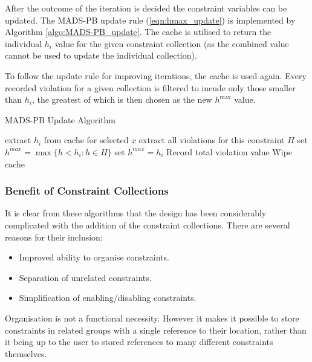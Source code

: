 After the outcome of the iteration is decided the constraint variables can be updated. The MADS-PB update rule (\ref{eqn:hmax_update}) is implemented by Algorithm \ref{algo:MADS-PB_update}. The cache is utilised to return the individual $h_i$ value for the given constraint collection (as the combined value cannot be used to update the individual collection). 

To follow the update rule for improving iterations, the cache is used again. Every recorded violation for a given collection is filtered to incude only those smaller than $h_i$, the greatest of which is then chosen as the new $h^{\max}$ value.

\begin{algorithm}
\caption{MADS-PB Update Algorithm}
\label{algo:MADS-PB_update}
\begin{algorithmic}
    \STATE extract $h_i$ from cache for selected $x$
        \STATE extract all violations for this constraint $H$
        \STATE set $h^{max}= \max\{h < h_i : h \in H\}$
    \ELSE
        \STATE set $h^{max}=h_i$ 
    \ENDIF
\ENDFOR
\STATE Record total violation value
\STATE Wipe cache
\end{algorithmic}
\end{algorithm}

\subsubsection{Benefit of Constraint Collections}

It is clear from these algorithms that the design has been considerably complicated with the addition of the constraint collections. There are several reasons for their inclusion:

\begin{itemize}
    \item Improved ability to organise constraints.
    \item Separation of unrelated constraints.
    \item Simplification of enabling/disabling constraints.
\end{itemize}

Organisation is not a functional necessity. However it makes it possible to store constraints in related groups with a single reference to their location, rather than it being up to the user to stored references to many different constraints themselves.

